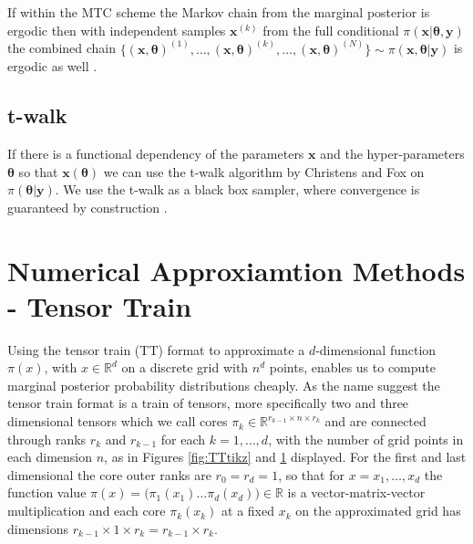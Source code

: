 If within the MTC scheme the Markov chain from the marginal posterior is ergodic then with independent samples $\bm{x}^{(k)}$ from the full conditional $\pi(\bm{x}|\bm{\theta}, \bm{y})$ the combined chain $\{  (\bm{x}, \bm{\theta} )^{(1)}, \dots, (\bm{x}, \bm{\theta} )^{(k)} , \dots,  (\bm{x}, \bm{\theta})^{(N)}  \} \sim \pi(\bm{x},\bm{\theta}| \bm{y})$ is ergodic as well \cite{acosta2014markov}.

\subsection{t-walk}
If there is a functional dependency of the parameters $\bm{x}$ and the hyper-parameters $\bm{\theta}$ so that $\bm{x}(\bm{\theta})$ we can use the t-walk algorithm by Christens and Fox on $\pi(\bm{\theta}|\bm{y} )$.
We use the t-walk as a black box sampler, where convergence is guaranteed by construction \cite{christen2010general}.



\section{Numerical Approxiamtion Methods - Tensor Train}
Using the tensor train (TT) format to approximate a $d$-dimensional function $\pi(x)$, with $x \in \mathbb{R}^d$ on a discrete grid with $n^d$ points, enables us to compute marginal posterior probability distributions cheaply.
As the name suggest the tensor train format is a train of tensors, more specifically two and three dimensional tensors which we call cores $\pi_{k} \in \mathbb{R}^{r_{k-1} \times n \times r_{k}}$  and are connected through ranks $r_{k}$ and $r_{k-1}$ for each $k = 1, \dots , d$, with the number of grid points in each dimension $n$, as in Figures \ref{fig:TTtikz} and \ref{} displayed.
For the first and last dimensional the core outer ranks are $r_0  = r_d = 1$, so that for $x = {x_1, \dots, x_d}$ the function value $\pi(x) = \big( \pi_1(x_1) \dots \pi_d(x_d) \big)\in \mathbb{R}$ is a vector-matrix-vector multiplication and each core $\pi_k(x_k)$ at a fixed $x_k$ on the approximated grid has dimensions $r_{k-1} \times 1 \times r_{k} =r_{k-1} \times r_{k}$.


